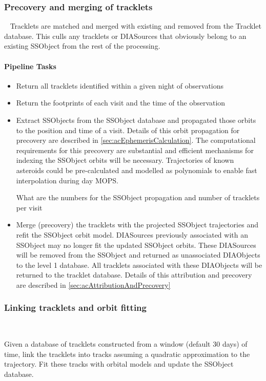 \subsubsection{Precovery and merging of tracklets}~
Tracklets are matched and merged with existing \SSObjects and removed from the Tracklet database. This culls any tracklets or DIASources that obviously belong to an existing SSObject from the rest of the processing. 

\paragraph{Pipeline Tasks}
\begin{itemize}
\item Return all tracklets identified within a given night of observations
\item Return the footprints of each visit and the time of the observation
\item Extract SSObjects from the SSObject database and propagated those orbits to the position and time of a visit. Details of this orbit propagation for precovery are described in \ref{sec:acEphemerisCalculation}. The computational requirements for this precovery are substantial and efficient mechanisms for indexing the SSObject orbits will be necessary. Trajectories of known asteroids could be pre-calculated and modelled as polynomials to enable fast interpolation during day MOPS.
\begin{note}What are the numbers for the SSObject propagation and number of tracklets per visit\end{note}
\item Merge (precovery) the tracklets with the projected SSObject trajectories and refit  the SSObject orbit model. DIASources previously associated with an SSObject may no longer fit the updated SSObject orbits. These DIASources will be removed from the SSObject and returned as unassociated DIAObjects to the level 1 database. All tracklets associated with these DIAObjects will be  returned to the tracklet database. Details of this attribution and precovery are described in \ref{sec:acAttributionAndPrecovery}
\end{itemize}

\subsubsection{Linking tracklets and orbit fitting}~

Given a database of tracklets constructed from a window (default 30 days) of time, link the tracklets into tracks assuming a quadratic approximation to the trajectory. Fit these tracks with orbital models and update the SSObject database.

